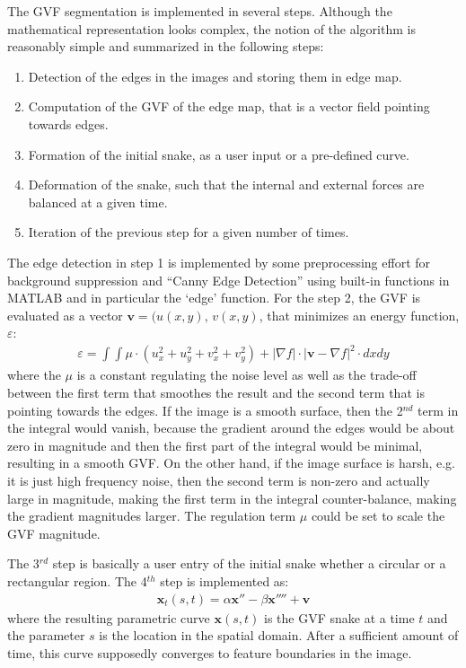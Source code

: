 \documentclass{article}
\begin{document}
The GVF segmentation is implemented in several steps. Although the mathematical representation looks complex, the notion of the algorithm is reasonably simple and summarized in the following steps:
\begin{enumerate}
\item Detection of the edges in the images and storing them in edge map.
\item Computation of the GVF of the edge map, that is a vector field pointing towards edges.
\item Formation of the initial snake, as a user input or a pre-defined curve.
\item Deformation of the snake, such that the internal and external forces are balanced at a given time.
\item Iteration of the previous step for a given number of times.
\end{enumerate}

The edge detection in step 1 is implemented by some preprocessing effort for background suppression and ``Canny Edge Detection'' using built-in functions in MATLAB and in particular the `edge' function. For the step 2, the GVF is evaluated as a vector $\mathbf{v}=(u(x,y),\, v(x,y)$, that minimizes an energy function, $\varepsilon$:
\begin{align*}
\varepsilon = \int \int \mu \cdot (u_x^2 +u_y^2+v_x^2+v_y^2)+|\nabla f|\cdot |\mathbf{v}-\nabla f|^2 \cdot dxdy
\end{align*}
where the $\mu$ is a constant regulating the noise level as well as the trade-off between the first term that smoothes the result and the second term that is pointing towards the edges. If the image is a smooth surface, then the 2$^{nd}$ term in the integral would vanish, because the gradient around the edges would be about zero in magnitude and then the first part of the integral would be minimal, resulting in a smooth GVF. On the other hand, if the image surface is harsh, e.g. it is just high frequency noise, then the second term is non-zero and actually large in magnitude, making the first term in the integral counter-balance, making the gradient magnitudes larger. The regulation term $\mu$ could be set to scale the GVF magnitude.

The 3$^{rd}$ step is basically a user entry of the initial snake whether a circular or a rectangular region. The 4$^{th}$ step is implemented as:
\begin{align*}
\mathbf{x}_t(s,t) = \alpha \mathbf{x}'' - \beta \mathbf{x}'''' + \mathbf{v}
\end{align*}
where the resulting parametric curve $\mathbf{x}(s,t)$ is the GVF snake at a time $t$ and the parameter $s$ is the location in the spatial domain. After a sufficient amount of time, this curve supposedly converges to feature boundaries in the image.
\end{document}
